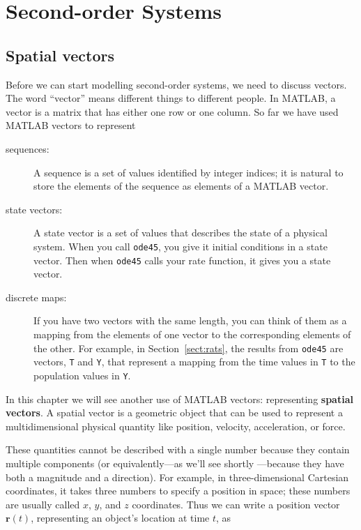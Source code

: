 \documentclass[
]{book}
\numberwithin{Answer}{chapter}
\numberwithin{Exercise}{chapter}
\renewcommand{\vec}[1]{\bm{\mathbf{#1}}}
\begin{document}
\chapter{Second-order Systems}

\section{Spatial vectors}
\label{sect:spacial}

Before we can start modelling second-order systems,
we need to discuss vectors. The word ``vector'' means different
things to different people.  In MATLAB, a vector is a matrix that has
either one row or one column.  So far we have used MATLAB vectors to
represent

\begin{description}

\item[sequences:] A sequence is a set of values identified by
integer indices; it is natural to store the elements of the
sequence as elements of a MATLAB vector.

\item[state vectors:] A state vector is a set of values that
describes the state of a physical system.  When you call
{\tt ode45}, you give it initial conditions in a state
vector.  Then when {\tt ode45} calls your rate function, it
gives you a state vector.

\item[discrete maps:] If you have two vectors with the same
length, you can think of them as a mapping from the elements
of one vector to the corresponding elements of the other.  For
example, in Section~\ref{sect:rats}, the results from {\tt ode45}
are vectors, {\tt T} and {\tt Y}, that represent a mapping
from the time values in {\tt T} to the population values in {\tt Y}.

\end{description}

In this chapter we will see another use of MATLAB vectors: representing
{\bf spatial vectors}.  A spatial vector is a geometric object that can be used to
represent a multidimensional physical quantity like position, velocity,
acceleration, or force.

These quantities cannot be described with a single number because they
contain multiple components (or equivalently---as we'll see shortly
---because they have both a magnitude and a direction).  For example,
in three-dimensional Cartesian coordinates, it takes three numbers
to specify a position in space; these numbers are usually called $x$,
$y$, and $z$ coordinates. Thus we can write a position vector $\vec{r}(t)$,
representing an object's location at time $t$, as
\end{document}
